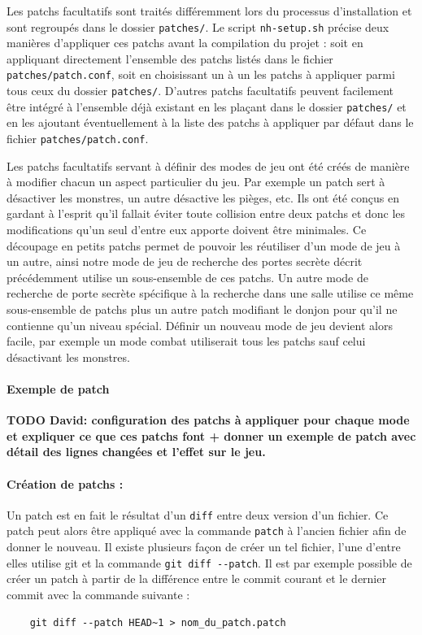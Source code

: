 \documentclass[a4paper,12pt]{article}
\begin{document}
Les patchs facultatifs sont traités différemment lors du processus
d'installation et sont regroupés dans le dossier \verb!patches/!. Le script
\verb!nh-setup.sh! précise deux manières d'appliquer ces patchs avant la
compilation du projet : soit en appliquant directement l'ensemble des patchs
listés dans le fichier \verb!patches/patch.conf!, soit en choisissant un à un
les patchs à appliquer parmi tous ceux du dossier \verb!patches/!.
D'autres patchs facultatifs peuvent facilement être intégré à l'ensemble déjà
existant en les plaçant dans le dossier \verb!patches/! et en les ajoutant
éventuellement à la liste des patchs à appliquer par défaut dans le fichier
\verb!patches/patch.conf!.

Les patchs facultatifs servant à définir des modes de jeu ont été créés de
manière à modifier chacun un aspect particulier du jeu. Par exemple un patch
sert à désactiver les monstres, un autre désactive les pièges, etc. Ils ont
été conçus en gardant à l'esprit qu'il fallait éviter toute collision entre
deux patchs et donc les modifications qu'un seul d'entre eux apporte doivent
être minimales.
Ce découpage en petits patchs permet de pouvoir les réutiliser d'un
mode de jeu à un autre, ainsi notre mode de jeu de recherche des portes
secrète décrit précédemment utilise un sous-ensemble de ces patchs. Un autre
mode de recherche de porte secrète spécifique à la recherche dans une salle
utilise ce
même sous-ensemble de patchs plus un autre patch modifiant le donjon pour
qu'il ne contienne qu'un niveau spécial. Définir un nouveau mode de jeu
devient alors facile, par exemple un mode combat utiliserait tous les patchs
sauf celui désactivant les monstres.

\paragraph{Exemple de patch}

\textbf{TODO David: configuration des patchs à appliquer pour chaque mode et
	expliquer ce que ces patchs font + donner un exemple de patch avec détail
	des lignes changées et l'effet sur le jeu.}

\paragraph{Création de patchs :}

Un patch est en fait le résultat d'un \verb!diff! entre
deux version d'un fichier. Ce patch peut alors être appliqué avec la commande
\verb!patch! à l'ancien fichier afin de donner le nouveau.
Il existe plusieurs façon de créer un tel fichier, l'une d'entre elles utilise
git et la commande \verb!git diff --patch!. Il est par exemple possible de
créer un patch à partir de la différence entre le commit courant et le dernier
commit avec la commande suivante :
\begin{verbatim}
    git diff --patch HEAD~1 > nom_du_patch.patch
\end{verbatim}
\end{document}
